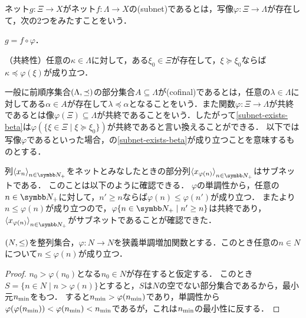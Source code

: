 \documentclass{ltjsbook}
\begin{document}
\begin{thmbox}
\begin{definition}[（サブネット）] ネット\(g \colon \Xi \to X\)がネット\(f \colon \Lambda \to X\)の(subnet)であるとは，写像\(\varphi \colon \Xi \to \Lambda\)が存在して，次の2つをみたすことをいう．
    \begin{conditions}
        \item\label{subnet-comp} \(g = f \circ \varphi\)．
        \item\label{subnet-exists-beta} （共終性）任意の\(\kappa \in \Lambda\)に対して，ある\(\xi_0 \in \Xi\)が存在して，\(\xi \succeq \xi_0\)ならば\(\kappa \preceq \varphi(\xi)\)が成り立つ．
    \end{conditions}
\end{definition}
\end{thmbox}

一般に前順序集合\((\Lambda, \mathord{\preceq})\)の部分集合\(A \subseteq \Lambda\)が(cofinal)であるとは，任意の\(\lambda \in \Lambda\)に対してある\(\alpha \in A\)が存在して\(\lambda \preceq \alpha\)となることをいう．また関数\(\varphi \colon \Xi \to \Lambda\)が共終であるとは像\(\varphi(\Xi) \subseteq \Lambda\)が共終であることをいう．したがって\ref{subnet-exists-beta}は\(\varphi(\{ \xi \in \Xi \mid \xi \succeq \xi_0\})\)が共終であると言い換えることができる．
以下では写像\(\varphi\)であるといった場合，の\ref{subnet-exists-beta}が成り立つことを意味するものとする．

列\(\Sequencen{x}\)をネットとみなしたときの部分列\(\Subsequence{x}\)はサブネットである．
このことは以下のように確認できる．
\(\varphi\)の単調性から，任意の\(n \in \PositiveInteger\)に対して，\(n' \geq n\)ならば\(\varphi(n) \leq \varphi(n')\)が成り立つ．
またより\(n \leq \varphi(n)\)が成り立つので，\(\varphi \{ n \in \PositiveInteger \mid n' \geq n\}\)は共終であり，\(\Subsequence{x}\)がサブネットであることが確認できた．

\begin{thmbox}
\begin{proposition} \((N, \mathord{\leq})\)を整列集合，\(\varphi\colon N \to N\)を狭義単調増加関数とする．このとき任意の\(n \in N\)について\(n \leq \varphi(n)\)が成り立つ．
\end{proposition}
\end{thmbox}

\begin{proof} \(n_0 > \varphi(n_0)\)となる\(n_0 \in N\)が存在すると仮定する．
このとき\(S = \{ n \in N \mid n > \varphi(n)\}\)とすると，\(S\)は\(N\)の空でない部分集合であるから，最小元\(n_{\text{min}}\)をもつ．
すると\(n_{\text{min}} > \varphi(n_{\text{min}})\)であり，単調性から\(\varphi(\varphi(n_{\text{min}})) < \varphi(n_{\text{min}}) < n_{\text{min}}\)であるが，これは\(n_{\text{min}}\)の最小性に反する．
\end{proof}
\end{document}
